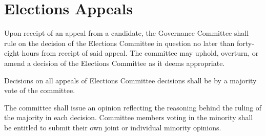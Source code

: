 \section{Elections Appeals}
\begin{bylaws-number}
	\item Upon receipt of an appeal from a candidate, the Governance Committee shall rule on the decision of the Elections Committee in question no later than forty-eight hours from receipt of said appeal. The committee may uphold, overturn, or amend a decision of the Elections Committee as it deems appropriate.
	\item Decisions on all appeals of Elections Committee decisions shall be by a majority vote of the committee.
	\item The committee shall issue an opinion reflecting the reasoning behind the ruling of the majority in each decision. Committee members voting in the minority shall be entitled to submit their own joint or individual minority opinions.
\end{bylaws-number}